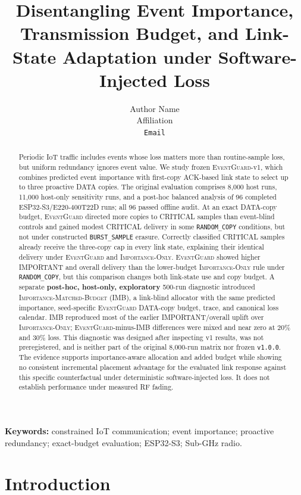 \documentclass[11pt]{article}
\title{Disentangling Event Importance, Transmission Budget, and Link-State Adaptation under Software-Injected Loss}
\author{Author Name\\Affiliation\\\texttt{Email}}
\date{}
\newcommand{\EG}{\textsc{EventGuard}}
\newcommand{\IO}{\textsc{Importance-Only}}
\begin{document}
\maketitle

\begin{abstract}
Periodic IoT traffic includes events whose loss matters more than routine-sample loss, but uniform redundancy ignores event value. We study frozen \EG{}-v1, which combines predicted event importance with first-copy ACK-based link state to select up to three proactive DATA copies. The original evaluation comprises 8,000 host runs, 11,000 host-only sensitivity runs, and a post-hoc balanced analysis of 96 completed ESP32-S3/E220-400T22D runs; all 96 passed offline audit. At an exact DATA-copy budget, \EG{} directed more copies to CRITICAL samples than event-blind controls and gained modest CRITICAL delivery in some \texttt{RANDOM\_COPY} conditions, but not under constructed \texttt{BURST\_SAMPLE} erasure. Correctly classified CRITICAL samples already receive the three-copy cap in every link state, explaining their identical delivery under \EG{} and \IO{}. \EG{} showed higher IMPORTANT and overall delivery than the lower-budget \IO{} rule under \texttt{RANDOM\_COPY}, but this comparison changes both link-state use and copy budget. A separate \textbf{post-hoc, host-only, exploratory} 500-run diagnostic introduced \textsc{Importance-Matched-Budget} (IMB), a link-blind allocator with the same predicted importance, seed-specific \EG{} DATA-copy budget, trace, and canonical loss calendar. IMB reproduced most of the earlier IMPORTANT/overall uplift over \IO{}; \EG{}-minus-IMB differences were mixed and near zero at 20\% and 30\% loss. This diagnostic was designed after inspecting v1 results, was not preregistered, and is neither part of the original 8,000-run matrix nor frozen \texttt{v1.0.0}. The evidence supports importance-aware allocation and added budget while showing no consistent incremental placement advantage for the evaluated link response against this specific counterfactual under deterministic software-injected loss. It does not establish performance under measured RF fading.

\end{abstract}

\noindent\textbf{Keywords:} constrained IoT communication; event importance; proactive redundancy; exact-budget evaluation; ESP32-S3; Sub-GHz radio.

\section{Introduction}\label{sec:introduction}
\end{document}
